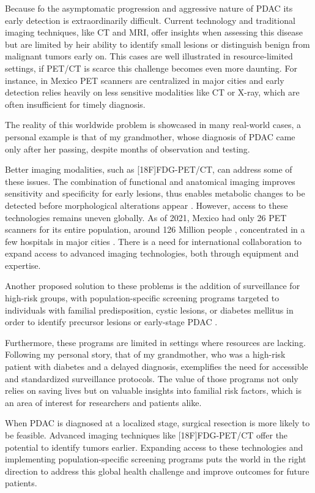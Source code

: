 \documentclass[11pt]{article} %
\begin{document}
Because fo the asymptomatic progression and aggressive nature of PDAC its early detection is extraordinarily difficult. Current technology and traditional imaging techniques, like CT and MRI, offer insights when assessing this disease but are limited by heir ability to identify small lesions or distinguish benign from malignant tumors early on. This cases are well illustrated in resource-limited settings, if PET/CT is scarce this challenge becomes even more daunting. For instance, in Mexico PET scanners are centralized in major cities and early detection relies heavily on less sensitive modalities like CT or X-ray, which are often insufficient for timely diagnosis.

The reality of this worldwide problem is showcased in many real-world cases, a personal example is that of my grandmother, whose diagnosis of PDAC came only after her passing, despite months of observation and testing.

Better imaging modalities, such as [18F]FDG-PET/CT, can address some of these issues. The combination of functional and anatomical imaging improves sensitivity and specificity for early lesions, thus enables metabolic changes to be detected before morphological alterations appear \cite{Pu2021}. However, access to these technologies remains uneven globally. As of 2021, Mexico had only 26 PET scanners for its entire population, around 126 Million people \cite{inegi_population}, concentrated in a few hospitals in major cities \cite{statista1}. There is a need for international collaboration to expand access to advanced imaging technologies, both through equipment and expertise.


Another proposed solution to these problems is the addition of surveillance for high-risk groups, with population-specific screening programs targeted to individuals with familial predisposition, cystic lesions, or diabetes mellitus in order to identify precursor lesions or early-stage PDAC \cite{Cancers2023}.

Furthermore, these programs are limited in settings where resources are lacking. Following my personal story, that of my grandmother, who was a high-risk patient with diabetes and a delayed diagnosis, exemplifies the need for accessible and standardized surveillance protocols. The value of those programs not only relies on saving lives but on valuable insights into familial risk factors, which is an area of interest for researchers and patients alike.

When PDAC is diagnosed at a localized stage, surgical resection is more likely to be feasible. Advanced imaging techniques like [18F]FDG-PET/CT offer the potential to identify tumors earlier. Expanding access to these technologies and implementing population-specific screening programs puts the world in the right direction to address this global health challenge and improve outcomes for future patients.
\end{document}

